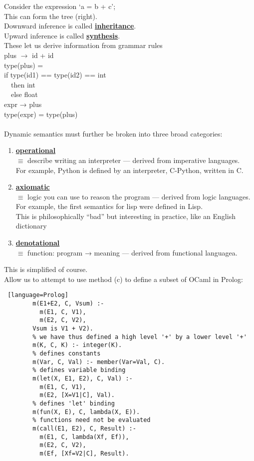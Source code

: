\documentclass[../../lecture_notes.tex]{subfiles}
\begin{document}
Consider the expression ‘a = b + c’;\\
\indent This can form the tree (right).\\
Downward inference is called \textbf{\underline{inheritance}}.\\
Upward inference is called \textbf{\underline{synthesis}}.\\
These let us derive information from grammar rules\\
\indent plus $\rightarrow$ id + id\\
\indent \indent type(plus) = \\
\indent \indent \indent if type(id1) == type(id2) == int\\
\indent \indent \indent \ \ then int\\
\indent \indent \indent \ \ else float\\
\indent expr → plus\\
 \indent \indent type(expr) = type(plus)\\
\\ 
 Dynamic semantics must further be broken into three broad categories:
 \begin{enumerate} [itemsep=0mm]
	\item \textbf{\underline{operational}}\\
		$\equiv$ describe writing an interpreter — derived from imperative languages.\\
		For example, Python is defined by an interpreter, C-Python, written in C.
	\item \textbf{\underline{axiomatic}}\\
		$\equiv$ logic you can use to reason the program — derived from logic languages.\\
		For example, the first semantics for lisp were defined in Lisp.\\
		This is philosophically “bad” but interesting in practice, like an English dictionary
	\item \textbf{\underline{denotational}}\\
		$\equiv$ function: program → meaning — derived from functional languagea.
\end{enumerate}
\noindent This is simplified of course.
\\
Allow us to attempt to use method (c) to define a subset of OCaml in Prolog:\\
\begin{lstlisting} [language=Prolog]
		m(E1+E2, C, Vsum) :-
		  m(E1, C, V1),
		  m(E2, C, V2),
		Vsum is V1 + V2).
		% we have thus defined a high level '+' by a lower level '+'
		m(K, C, K) :- integer(K).
		% defines constants
		m(Var, C, Val) :- member(Var=Val, C).
		% defines variable binding
		m(let(X, E1, E2), C, Val) :-
		  m(E1, C, V1),
		  m(E2, [X=V1|C], Val).
		% defines 'let' binding
		m(fun(X, E), C, lambda(X, E)).
		% functions need not be evaluated
		m(call(E1, E2), C, Result) :-
		  m(E1, C, lambda(Xf, Ef)),
		  m(E2, C, V2),
		  m(Ef, [Xf=V2|C], Result).
\end{lstlisting}
\end{document}
